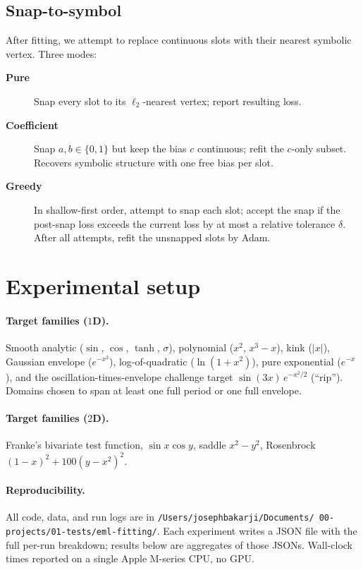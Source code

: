 \documentclass[11pt]{article}
\begin{document}
\subsection{Snap-to-symbol}
\label{sec:snap}
After fitting, we attempt to replace continuous slots with their nearest
symbolic vertex. Three modes:
\begin{description}
\item[\textbf{Pure}] Snap every slot to its $\ell_2$-nearest vertex; report
  resulting loss.
\item[\textbf{Coefficient}] Snap $a, b \in \{0, 1\}$ but keep the bias $c$
  continuous; refit the $c$-only subset. Recovers symbolic structure with one
  free bias per slot.
\item[\textbf{Greedy}] In shallow-first order, attempt to snap each slot;
  accept the snap if the post-snap loss exceeds the current loss by at most a
  relative tolerance $\delta$. After all attempts, refit the unsnapped slots
  by Adam.
\end{description}

\section{Experimental setup}

\paragraph{Target families ($1$D).}
Smooth analytic ($\sin$, $\cos$, $\tanh$, $\sigma$), polynomial ($x^2$,
$x^3 - x$), kink ($|x|$), Gaussian envelope ($e^{-x^2}$),
log-of-quadratic ($\ln(1+x^2)$), pure exponential ($e^{-x}$), and the
oscillation-times-envelope challenge target $\sin(3x)\,e^{-x^2/2}$ (``rip'').
Domains chosen to span at least one full period or one full envelope.

\paragraph{Target families ($2$D).}
Franke's bivariate test function, $\sin x \cos y$, saddle $x^2 - y^2$,
Rosenbrock $(1-x)^2 + 100(y - x^2)^2$.

\paragraph{Reproducibility.}
All code, data, and run logs are in \texttt{/Users/josephbakarji/Documents/
00-projects/01-tests/eml-fitting/}. Each experiment writes a JSON file with the
full per-run breakdown; results below are aggregates of those JSONs. Wall-clock
times reported on a single Apple M-series CPU, no GPU.
\end{document}

